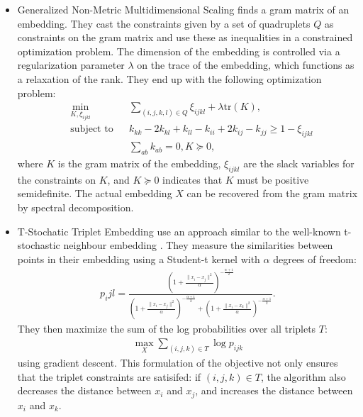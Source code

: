 \begin{itemize}
    \item Generalized Non-Metric Multidimensional Scaling \citep[GNDMS,][]{agarwalGeneralizedNonmetricMultidimensional2007} finds a gram matrix of an embedding. They cast
        the constraints given by a set of quadruplets $Q$ as constraints on the gram matrix 
        and use these as inequalities in a constrained optimization problem. The dimension
        of the embedding is controlled via a regularization parameter $\lambda$ on
        the trace of the embedding, which functions as a relaxation of the rank. 
        They end up with the following optimization problem:
        \begin{align*}
            &\min_{K, \xi_{ijkl}}          &       & \sum_{(i,j,k,l) \in Q} \xi_{ijkl} + \lambda 
            \text{tr}(K),\\
            &\text{subject to} &       & k_{kk} - 2k_{kl} + k_{ll} - k_{ii} + 2k_{ij} - k_{jj}
            \ge 1 - \xi_{ijkl}\\
            &                  &       & \sum_{ab} k_{ab} = 0, K \succeq 0,
        \end{align*}
        where $K$ is the gram matrix of the embedding, $\xi_{ijkl}$ are the slack variables
        for the constraints on $K$, and $K \succeq 0$ indicates that $K$ must be
        positive semidefinite. The actual embedding $X$ can be recovered from the gram matrix by
        spectral decomposition. 
    \item T-Stochatic Triplet Embedding \citep[T-STE][]{laurensvandermaatenStochasticTripletEmbedding2012} use an approach similar to the well-known t-stochastic neighbour embedding \citep[t-SNE][]{maatenVisualizingDataUsing2008}. 
        They measure the similarities between points in their embedding using a Student-t kernel 
        with $\alpha$ degrees of freedom: 
        \begin{align*}
            p_ijl = \frac
            { \left( 1+ \frac{  \|x_i - x_j\|^2 }{\alpha}  \right)^{- \frac{\alpha + 1}{2}}  
            }
            { \left( 1+ \frac{  \|x_i - x_j\|^2 }{\alpha}  \right)^{- \frac{\alpha + 1}{2}} +
              \left( 1+ \frac{  \|x_i - x_k\|^2 }{\alpha}  \right)^{- \frac{\alpha + 1}{2}}  
            }
        .\end{align*}
        They then maximize the sum of the log probabilities over all triplets $T$:
        \begin{align*}
            \max_{X} \sum_{(i,j,k) \in T} \log p_{ijk}
        \end{align*}
        using gradient descent.
        This formulation of the objective not only ensures that the 
        triplet constraints are satisifed: if $(i,j,k) \in T$, the algorithm 
        also decreases the distance between $x_i$ and $x_j$, and increases the distance
        between $x_i$ and $x_k$. 
\end{itemize}

